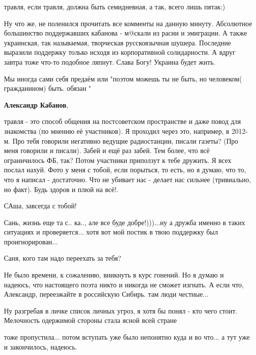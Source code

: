 \begin{itemize}
травля, если травля, должна быть семидневная, а так, всего лишь пятак:)


Ну что же, не поленился прочитать все комменты на данную минуту. Абсолютное
большинство поддержавших кабанова - м@скали из расии и эмиграции. А также
украинская, так называемая, творческая русскоязычная шушера. Последние выразили
поддержку только исходя из корпоративной солидарности. А вдруг завтра тоже
что-то подобное ляпнут. Слава Богу! Украина будет жить.


Мы иногда сами себя предаём или "поэтом можешь ты не быть, но человеком(
гражданином) быть. обязан "

\textbf{Александр Кабанов}, 

травля - это способ общения на постсоветском пространстве и даже повод для
знакомства (по мнению её участников). Я проходил через это, например, в 2012-м.
Про тебя говорили негативно ведущие радиостанции, писали газеты? (Про меня
говорили и писали). Забей и ещё раз забей. Тем более, что всё ограничилось ФБ,
так? Потом участники приползут к тебе дружить. Я всех послал нахуй. Фото у меня
с тобой, если порыться, то есть, но я думаю, что то, что я написал -
достаточно. Что не убивает нас - делает нас сильнее (тривиально, но факт).
Будь здоров и плюй на всё!.

САша, завсегда с тобой!


Сань, жизнь еще та с.. ка.., але все буде добре!)))...ну а дружба именно в таких
ситуациях и проверяется... хотя вот мой постик в твою поддержку был
проигнорирован...


Саня, кого там надо переехать за тебя?


Не было времени, к сожалению, вникнуть в курс гонений. Но я думаю и надеюсь,
что настоящего поэта никто и никогда не сможет изгнать. А если что, Александр,
переезжайте в российскую Сибирь. там люди честные...


Ну разгребая в личке список личных угроз, я хотя бы понял - кто чего стоит. Мелочность одержимой стороны стала ясной всей стране

тоже пропустила... потом вступать уже было непонятно куда и во что... а тут уже и закончилось, надеюсь.


\end{itemize}
